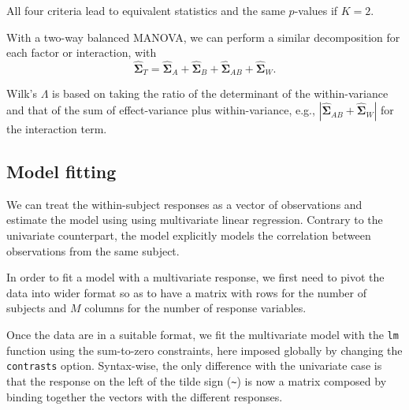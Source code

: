 \documentclass[
  11pt,
  letterpaper,
]{scrbook}
\theoremstyle{definition}
\theoremstyle{remark}
\begin{document}
All four criteria lead to equivalent statistics and the same
\(p\)-values if \(K=2\).

With a two-way balanced MANOVA, we can perform a similar decomposition
for each factor or interaction, with
\[\widehat{\boldsymbol{\Sigma}}_T = \widehat{\boldsymbol{\Sigma}}_A + \widehat{\boldsymbol{\Sigma}}_B + \widehat{\boldsymbol{\Sigma}}_{AB} + \widehat{\boldsymbol{\Sigma}}_W.\]

Wilk's \(\Lambda\) is based on taking the ratio of the determinant of
the within-variance and that of the sum of effect-variance plus
within-variance, e.g.,
\(|\widehat{\boldsymbol{\Sigma}}_{AB} + \widehat{\boldsymbol{\Sigma}}_W|\)
for the interaction term.

\hypertarget{model-fitting}{%
\subsection{Model fitting}\label{model-fitting}}

We can treat the within-subject responses as a vector of observations
and estimate the model using using multivariate linear regression.
Contrary to the univariate counterpart, the model explicitly models the
correlation between observations from the same subject.

In order to fit a model with a multivariate response, we first need to
pivot the data into wider format so as to have a matrix with rows for
the number of subjects and \(M\) columns for the number of response
variables.

Once the data are in a suitable format, we fit the multivariate model
with the \texttt{lm} function using the sum-to-zero constraints, here
imposed globally by changing the \texttt{contrasts} option. Syntax-wise,
the only difference with the univariate case is that the response on the
left of the tilde sign (\texttt{\textasciitilde{}}) is now a matrix
composed by binding together the vectors with the different responses.
\end{document}
